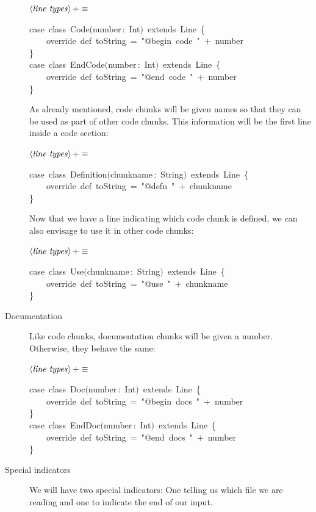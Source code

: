 \documentclass[a4paper,12pt]{article}
\begin{document}
\begin{description}
$\left<\mbox{\emph{line types}}\right>+\equiv$
\begin{program}{\vem case}~{\vem class}~Code$($number\,{\rm :}~Int$)$~{\vem extends}~Line~{\small\{}
\\~~~~{\vem override}~{\vem def}~toString~=~"@begin~code~"~$+$~number
\\{\small\}}
\\{\vem case}~{\vem class}~EndCode$($number\,{\rm :}~Int$)$~{\vem extends}~Line~{\small\{}
\\~~~~{\vem override}~{\vem def}~toString~=~"@end~code~"~$+$~number
\\{\small\}}
\\[0.5em]\end{program}
As already mentioned, code chunks will be given names so that they
can be used as part of other code chunks. This information will be the
first line inside a code section:

$\left<\mbox{\emph{line types}}\right>+\equiv$
\begin{program}{\vem case}~{\vem class}~Definition$($chunkname\,{\rm :}~String$)$~{\vem extends}~Line~{\small\{}
\\~~~~{\vem override}~{\vem def}~toString~=~"@defn~"~$+$~chunkname
\\{\small\}}
\\[0.5em]\end{program}
Now that we have a line indicating which code chunk is defined, we can
also envisage to use it in other code chunks:

$\left<\mbox{\emph{line types}}\right>+\equiv$
\begin{program}{\vem case}~{\vem class}~Use$($chunkname\,{\rm :}~String$)$~{\vem extends}~Line~{\small\{}
\\~~~~{\vem override}~{\vem def}~toString~=~"@use~"~$+$~chunkname
\\{\small\}}
\\[0.5em]\end{program}
\item[Documentation] Like code chunks, documentation chunks will be given
a number. Otherwise, they behave the same:

$\left<\mbox{\emph{line types}}\right>+\equiv$
\begin{program}{\vem case}~{\vem class}~Doc$($number\,{\rm :}~Int$)$~{\vem extends}~Line~{\small\{}
\\~~~~{\vem override}~{\vem def}~toString~=~"@begin~docs~"~$+$~number
\\{\small\}}
\\{\vem case}~{\vem class}~EndDoc$($number\,{\rm :}~Int$)$~{\vem extends}~Line~{\small\{}
\\~~~~{\vem override}~{\vem def}~toString~=~"@end~docs~"~$+$~number
\\{\small\}}
\\[0.5em]\end{program}
\item[Special indicators] We will have two special indicators: One telling us
which file we are reading and one to indicate the end of our input.


\end{description}
\end{document}
